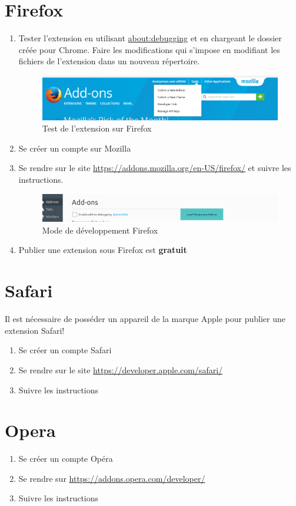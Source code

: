 \documentclass[a4paper,10pt]{report}
\begin{document}
\section{Firefox}
\begin{enumerate}

 \item Tester l'extension en utilisant \url{about:debugging} et en chargeant le dossier créée pour Chrome. Faire les modifications qui s'impose en modifiant les fichiers de l'extension dans un nouveau répertoire.
 \begin{figure}[h!]
  \includegraphics[scale=0.2]{test_firefox.png}
  \caption{Test de l'extension sur Firefox}
 \end{figure}
 \item Se créer un compte sur Mozilla
 \item Se rendre sur le site \url{https://addons.mozilla.org/en-US/firefox/} et suivre les instructions.
\begin{figure}[h]
 \includegraphics[scale=0.5]{firefox.png}
 \caption{Mode de développement Firefox}
\end{figure}
 \item Publier une extension sous Firefox est \textbf{gratuit}
\end{enumerate}





\section{Safari}

Il est nécessaire de posséder un appareil de la marque Apple pour publier une extension Safari!
\begin{enumerate}
 \item Se créer un compte Safari
 \item Se rendre sur le site \url{https://developer.apple.com/safari/}
 \item Suivre les instructions
\end{enumerate}





\section{Opera}
\begin{enumerate}
 \item Se créer un compte Opéra
 \item Se rendre sur \url{https://addons.opera.com/developer/}
 \item Suivre les instructions
\end{enumerate}
\end{document}
